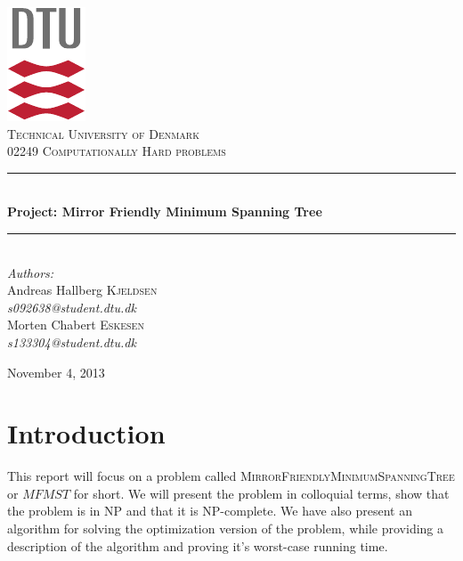 \documentclass[12pt]{report}
\newcommand{\HRuleFat}{\rule{\linewidth}{0.5mm}}
\begin{document}
\begin{titlepage}
\begin{center}

\includegraphics[scale=2.0]{dtu_logo.pdf}\\[1cm]

\textsc{\LARGE Technical University of Denmark}\\[1.25cm]

\textsc{\Large 02249 Computationally Hard problems}\\[0.5cm]


\HRuleFat \\[0.4cm]
{\huge \bfseries Project: Mirror Friendly Minimum Spanning Tree}\\[0.1cm]
\HRuleFat \\[1.5cm]

\large
\emph{Authors:}
\\[10pt]
Andreas Hallberg \textsc{Kjeldsen}\\
\emph{s092638@student.dtu.dk}
\\[10pt]
Morten Chabert \textsc{Eskesen}\\
\emph{s133304@student.dtu.dk}

\vfill

{\large November 4, 2013}

\end{center}
\end{titlepage}

\tableofcontents

\chapter{Introduction}
\label{chapt:intro}
This report will focus on a problem called \textsc{MirrorFriendlyMinimumSpanningTree} or $MFMST$ for short. We will present the problem in colloquial terms, show that the problem is in NP and that it is NP-complete. We have also present an algorithm for solving the optimization version of the problem, while providing a description of the algorithm and proving it's worst-case running time.\\
\end{document}
